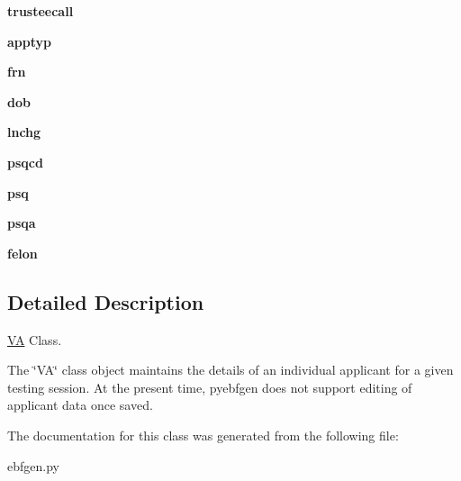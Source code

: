 \begin{DoxyCompactItemize}
\mbox{\label{classebfgen_1_1VA_ae3b1f91f5cd80a96aa476a4aef1ab59c}} 
{\bfseries trusteecall}
\item 
\mbox{\label{classebfgen_1_1VA_a842c14650ed01ec55cf408c8103caf25}} 
{\bfseries apptyp}
\item 
\mbox{\label{classebfgen_1_1VA_aac8ec55be3de85f83331d34b1ffbc9a2}} 
{\bfseries frn}
\item 
\mbox{\label{classebfgen_1_1VA_ae82a18287640edf9a020e85939925036}} 
{\bfseries dob}
\item 
\mbox{\label{classebfgen_1_1VA_a07a5f205dbdc509a88865d8e22c61c87}} 
{\bfseries lnchg}
\item 
\mbox{\label{classebfgen_1_1VA_a90c902db56a8a396d99eebdf67fda4d6}} 
{\bfseries psqcd}
\item 
\mbox{\label{classebfgen_1_1VA_a28551d85cb13f759880c76926876c01e}} 
{\bfseries psq}
\item 
\mbox{\label{classebfgen_1_1VA_acb3e7be0b59346ca415bac320fac379b}} 
{\bfseries psqa}
\item 
\mbox{\label{classebfgen_1_1VA_a1e1da0cbed7cd1cbfb227b4b1c893f24}} 
{\bfseries felon}
\end{DoxyCompactItemize}


\subsection{Detailed Description}
\hyperlink{classebfgen_1_1VA}{VA} Class. 

The \char`\"{}\+V\+A\char`\"{} class object maintains the details of an individual applicant for a given testing session. At the present time, pyebfgen does not support editing of applicant data once saved. 

The documentation for this class was generated from the following file\+:\begin{DoxyCompactItemize}
\item 
ebfgen.\+py\end{DoxyCompactItemize}
